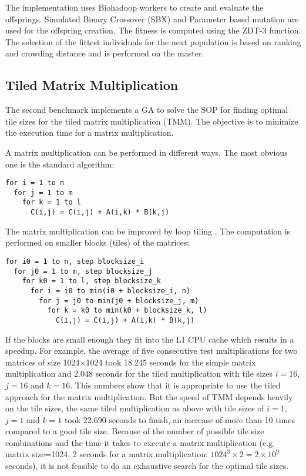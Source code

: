 The implementation uses Biohadoop workers to create and evaluate the offsprings. Simulated Binary Crossover (SBX) and Parameter based mutation \cite{deb2000efficient} are used for the offspring creation. The fitness is computed using the ZDT-3 function. The selection of the fittest individuals for the next population is based on ranking and crowding distance and is performed on the master.

\subsection{Tiled Matrix Multiplication}
\label{chap:evaluation:tiledmul}
The second benchmark implements a GA to solve the SOP for finding optimal tile sizes for the tiled matrix multiplication (TMM). The objective is to minimize the execution time for a matrix multiplication.

A matrix multiplication can be performed in different ways. The most obvious one is the standard algorithm:
\begin{lstlisting}
for i = 1 to n
  for j = 1 to m
    for k = 1 to l
      C(i,j) = C(i,j) + A(i,k) * B(k,j)
\end{lstlisting}

The matrix multiplication can be improved by loop tiling \cite{wolfe1989more}. The computation is performed on smaller blocks (tiles) of the matrices:
\begin{lstlisting}
for i0 = 1 to n, step blocksize_i
  for j0 = 1 to m, step blocksize_j
    for k0 = 1 to l, step blocksize_k
      for i = i0 to min(i0 + blocksize_i, n)
        for j = j0 to min(j0 + blocksize_j, m)
          for k = k0 to min(k0 + blocksize_k, l)
            C(i,j) = C(i,j) + A(i,k) * B(k,j)
\end{lstlisting}

If the blocks are small enough they fit into the L1 CPU cache which results in a speedup. For example, the average of five consecutive test multiplications for two matrices of size 1024$\times$1024 took 18.245 seconds for the simple matrix multiplication and 2.048 seconds for the tiled multiplication with tile sizes $i=16$, $j=16$ and $k=16$. This numbers show that it is appropriate to use the tiled approach for the matrix multiplication. But the speed of TMM depends heavily on the tile sizes, the same tiled multiplication as above with tile sizes of $i=1$, $j=1$ and $k=1$ took 22.690 seconds to finish, an increase of more than 10 times compared to a good tile size. Because of the number of possible tile size combinations and the time it takes to execute a matrix multiplication (e.g. matrix size=1024, 2 seconds for a matrix multiplication: $1024^3 \times 2 = 2\times{10^9} $ seconds), it is not feasible to do an exhaustive search for the optimal tile sizes.

